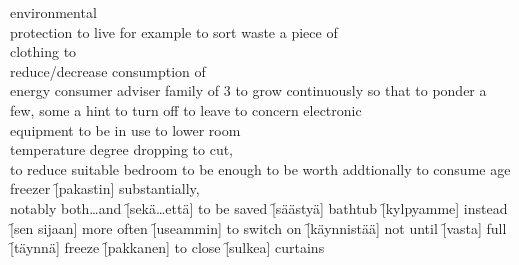 \begin{questions}
  \begin{multicols}{3}
    \raggedcolumns
    \question environmental\\protection \fillin[ympäristönsuojelu]
    \question to live \fillin[elää]
    \question for example \fillin[esimerkiksi]
    \question to sort \fillin[lajitella]
    \question waste \fillin[jäte]
    \question a piece of\\
              clothing 
    \question to \\reduce/decrease \fillin[vähentää$+$P]
    \question consumption of \\energy \fillin[sähkönkulutus]
    \question consumer \fillin[kuluttaja]
    \question adviser \fillin[neuvoja]
    \question family of $3$ 
    \question to grow \fillin[kasvaa]
    \question continuously \fillin[jatkuvasti][0.5in]
    \question so that \fillin[jotta]
    \question to ponder \fillin[miettiä]
    \question a few, some \fillin[muutama]
    \question a hint \fillin[vinkki]
    \question to turn off \fillin[sammuttaa]
    \question to leave \fillin[poistua]
    \question to concern \fillin[koskea$+$P]
    \question electronic\\equipment \fillin[elektroniikkalaite]
    \question to be in use 
    \question to lower \fillin[laskea]
    \question room \\temperature \fillin[huonelämpötilä]
    \question degree \fillin[aste][0.5in]
    \question dropping \fillin[pudotus][0.5in]
    \question to cut,\\to reduce \fillin[pienentää][0.5in]
    \question suitable \fillin[sopiva][0.5in]
    \question bedroom \fillin[makuuhuone][0.5in]
    \question to be enough \fillin[riittää][0.5in]
    \question to be worth \fillin[G$+$kannattaa]
    \question addtionally \fillin[lisäksi][0.5in]
    \question to consume \fillin[kuluttaa$+$P][0.5in]
    \question age \fillin[ikä][0.5in]
    \question freezer \f[pakastin]
    \question substantially,\\notably \fillin[huomattavasti]
    \question both\ldots and \f[sekä\ldots että]
    \question to be saved \f[säästyä]
    \question bathtub \f[kylpyamme]
    \question instead \f[sen sijaan]
    \question more often \f[useammin]
    \question to switch on \f[käynnistää]
    \question not until \f[vasta]
    \question full \f[täynnä]
    \question freeze \f[pakkanen]
    \question to close \f[sulkea]
    \question curtains \fillin[ikkunaverhot]

\end{multicols}
\end{questions}
